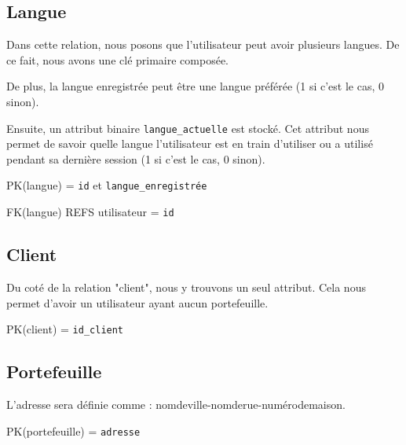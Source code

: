 \subsection{Langue}
\begin{flushleft}
Dans cette relation, nous posons que l'utilisateur peut avoir plusieurs langues. De ce fait, nous avons une clé primaire composée. 
\end{flushleft}

\begin{flushleft}
De plus, la langue enregistrée peut être une langue préférée (1 si c'est le cas, 0 sinon). 
\end{flushleft}

\begin{flushleft}
Ensuite, un attribut binaire \texttt{langue\_actuelle} est stocké. Cet attribut nous permet de savoir quelle langue l'utilisateur est en train d'utiliser ou a utilisé pendant sa dernière session (1 si c'est le cas, 0 sinon). 
\end{flushleft}

\begin{flushleft}
PK(langue) = \texttt{id} et \texttt{langue\_enregistrée}
\end{flushleft}

\begin{flushleft}
FK(langue) REFS utilisateur = \texttt{id}
\end{flushleft}
\subsection{Client}
\begin{flushleft}
Du coté de la relation "client", nous y trouvons un seul attribut. Cela nous permet d'avoir un utilisateur ayant aucun portefeuille.
\end{flushleft}

\begin{flushleft}
PK(client) = \texttt{id\_client}
\end{flushleft}
\subsection{Portefeuille}
\begin{flushleft}
L'adresse sera définie comme : nomdeville-nomderue-numérodemaison. 
\end{flushleft}

\begin{flushleft}
PK(portefeuille) = \texttt{adresse}
\end{flushleft}

